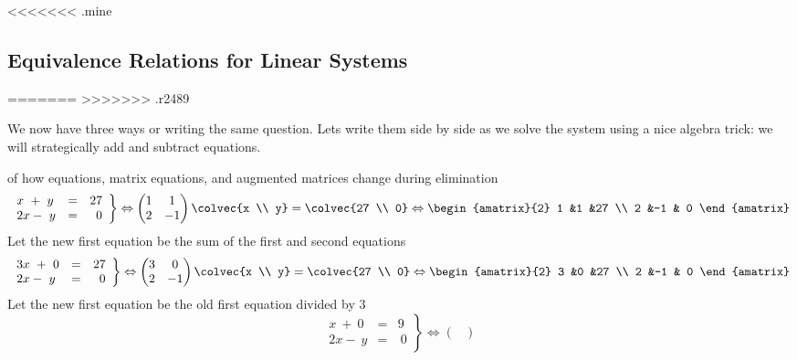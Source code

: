 <<<<<<< .mine
\subsection*{Equivalence Relations for Linear Systems}
=======
>>>>>>> .r2489

We now have three ways or writing the same question. 
Lets write them side by side as we solve the system using a nice algebra trick: we will strategically add and subtract  equations.

\begin{example} of how equations, matrix equations, and augmented matrices change during elimination
\[
   \left.
\begin{array}{lcr}
	x\ +\ y & = & 27 \\
	2x-\ y & = &\  0 
     \end{array}
   \right\} 
   \Leftrightarrow
    \begin{pmatrix}
      1             &1  \\
      2             &-1
    \end{pmatrix}
  \colvec{x \\ y}
  =
  \colvec{27 \\ 0}
  \Leftrightarrow
 \begin{amatrix}{2}
1 &1 &27 \\ 2 &-1 & 0
\end{amatrix}
\]
Let the new first equation be the sum of the first and second equations
\[
   \left.
\begin{array}{lcr}
	3x\ +\ 0 & = & 27 \\
	2x-\ y & = &\  0 
     \end{array}
   \right\} 
   \Leftrightarrow
    \begin{pmatrix}
      3             &0  \\
      2             &-1
    \end{pmatrix}
  \colvec{x \\ y}
  =
  \colvec{27 \\ 0}
  \Leftrightarrow
 \begin{amatrix}{2}
3 &0 &27 \\ 2 &-1 & 0
\end{amatrix}
\]
Let the new first equation be the old first equation divided by 3
\[
   \left.
\begin{array}{lcr}
	x\ +\ 0 & = & 9 \\
	2x-\ y & = &\  0 
     \end{array}
   \right\} 
   \Leftrightarrow
    \begin{pmatrix}

\end{pmatrix}\]
\end{example}

